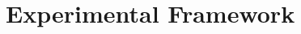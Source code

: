 \documentclass[preprint,12pt]{elsarticle}
\begin{document}

\section*{Experimental Framework}
\end{document}
